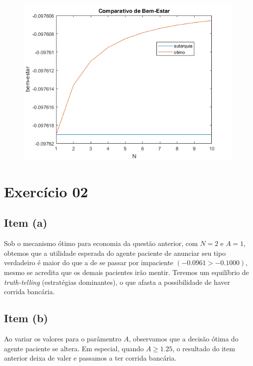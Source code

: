 \documentclass{article}
\begin{document}
\begin{figure}[!h]

\includegraphics[scale=0.6]{Ex1/ex1_1.png}

\end{figure}


\section*{Exercício 02}

\subsection*{Item (a)}

Sob o mecanismo ótimo para economia da questão anterior, com $N=2$ e $A=1$, obtemos que
a utilidade esperada do agente paciente de anunciar seu tipo verdadeiro é maior do que a de se passar por impaciente
$(-0.0961 > -0.1000)$, mesmo se acredita que os demais pacientes irão mentir. Teremos um equilíbrio de \textit{truth-telling}
(estratégias dominantes), o que afasta a possibilidade de haver corrida bancária. 

\subsection*{Item (b)}

Ao variar os valores para o parâmentro $A$, observamos que a decisão ótima do agente 
paciente se altera. Em especial, quando $A \geq 1.25$, o resultado do item anterior
deixa de valer e passamos a ter corrida bancária.
\end{document}
